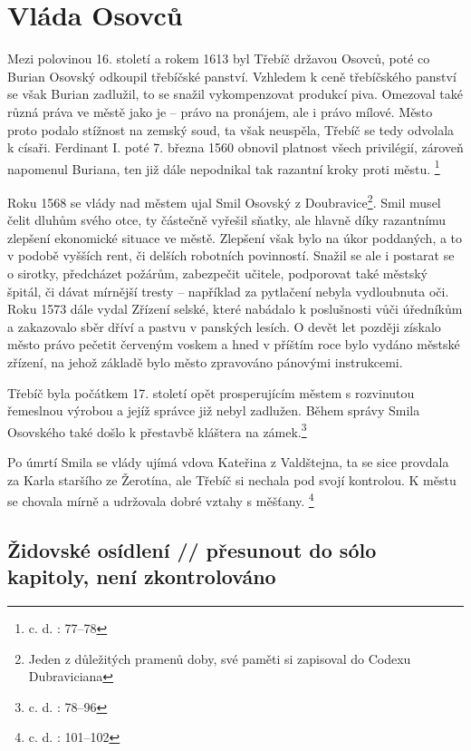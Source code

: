 \documentclass[a4paper,oneside,12p]{report}
\begin{document}
\section{Vláda Osovců}

Mezi polovinou 16. století a rokem 1613 byl Třebíč državou Osovců, poté co Burian Osovský odkoupil třebíčské panství.
Vzhledem k ceně třebíčského panství se však Burian zadlužil, to se snažil vykompenzovat produkcí piva.
Omezoval také různá práva ve městě jako je -- právo na pronájem, ale i právo mílové.
Město proto podalo stížnost na zemský soud, ta však neuspěla, Třebíč se tedy odvolala k císaři.
Ferdinant I. poté 7. března 1560 obnovil platnost všech privilégií, zároveň napomenul Buriana, ten již dále nepodnikal tak razantní kroky proti městu. \footnote{c. d. : 77--78}

Roku 1568 se vlády nad městem ujal Smil Osovský z Doubravice\footnote{Jeden z důležitých pramenů doby, své paměti si zapisoval do Codexu Dubraviciana}.
Smil musel čelit dluhům svého otce, ty částečně vyřešil sňatky, ale hlavně díky razantnímu zlepšení ekonomické situace ve městě.
Zlepšení však bylo na úkor poddaných, a to v podobě vyšších rent, či delších robotních povinností.
Snažil se ale i postarat se o sirotky, předcházet požárům, zabezpečit učitele, podporovat také městský špitál, či dávat mírnější tresty -- například za pytlačení nebyla vydloubnuta oči.
Roku 1573 dále vydal Zřízení selské, které nabádalo k poslušnosti vůči úředníkům a zakazovalo sběr dříví a pastvu v panských lesích.
O devět let později získalo město právo pečetit červeným voskem a hned v příštím roce bylo vydáno městské zřízení, na jehož základě bylo město zpravováno pánovými instrukcemi.

Třebíč byla počátkem 17. století opět prosperujícím městem s rozvinutou řemeslnou výrobou a jejíž správce již nebyl zadlužen.
Během správy Smila Osovského také došlo k přestavbě kláštera na zámek.\footnote{c. d. : 78--96}

Po úmrtí Smila se vlády ujímá vdova Kateřina z Valdštejna, ta se sice provdala za Karla staršího ze Žerotína, ale Třebíč si nechala pod svojí kontrolou.
K městu se chovala mírně a udržovala dobré vztahy s měšťany. \footnote{c. d. : 101--102}

\subsection{Židovské osídlení // přesunout do sólo kapitoly, není zkontrolováno}
\end{document}
